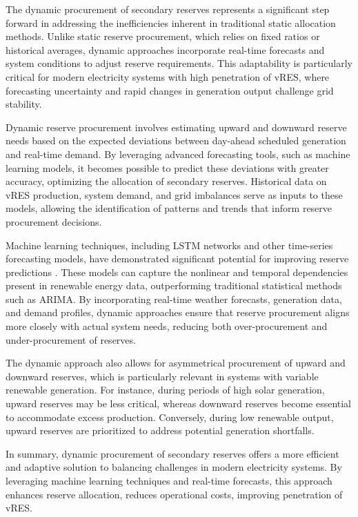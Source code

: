 The dynamic procurement of secondary reserves represents a significant step forward in addressing the inefficiencies inherent in traditional static allocation methods. Unlike static reserve procurement, which relies on fixed ratios or historical averages, dynamic approaches incorporate real-time forecasts and system conditions to adjust reserve requirements. This adaptability is particularly critical for modern electricity systems with high penetration of \gls{vRES}, where forecasting uncertainty and rapid changes in generation output challenge grid stability.

Dynamic reserve procurement involves estimating upward and downward reserve needs based on the expected deviations between day-ahead scheduled generation and real-time demand. By leveraging advanced forecasting tools, such as machine learning models, it becomes possible to predict these deviations with greater accuracy, optimizing the allocation of secondary reserves. Historical data on vRES production, system demand, and grid imbalances serve as inputs to these models, allowing the identification of patterns and trends that inform reserve procurement decisions.

Machine learning techniques, including \gls{LSTM} networks and other time-series forecasting models, have demonstrated significant potential for improving reserve predictions \cite{Costa2022}\cite{Benti2023}. These models can capture the nonlinear and temporal dependencies present in renewable energy data, outperforming traditional statistical methods such as ARIMA. By incorporating real-time weather forecasts, generation data, and demand profiles, dynamic approaches ensure that reserve procurement aligns more closely with actual system needs, reducing both over-procurement and under-procurement of reserves.

The dynamic approach also allows for asymmetrical procurement of upward and downward reserves, which is particularly relevant in systems with variable renewable generation. For instance, during periods of high solar generation, upward reserves may be less critical, whereas downward reserves become essential to accommodate excess production. Conversely, during low renewable output, upward reserves are prioritized to address potential generation shortfalls.

In summary, dynamic procurement of secondary reserves offers a more efficient and adaptive solution to balancing challenges in modern electricity systems. By leveraging machine learning techniques and real-time forecasts, this approach enhances reserve allocation, reduces operational costs, improving penetration of \gls{vRES}.